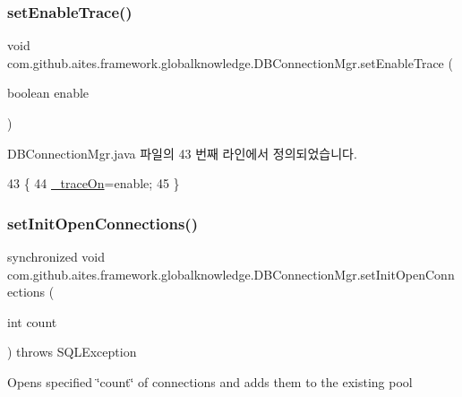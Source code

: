 \subsubsection{\texorpdfstring{set\+Enable\+Trace()}{setEnableTrace()}}
{\footnotesize\ttfamily void com.\+github.\+aites.\+framework.\+globalknowledge.\+D\+B\+Connection\+Mgr.\+set\+Enable\+Trace (\begin{DoxyParamCaption}\item[{boolean}]{enable }\end{DoxyParamCaption})}



D\+B\+Connection\+Mgr.\+java 파일의 43 번째 라인에서 정의되었습니다.


\begin{DoxyCode}
43                                               \{
44         \mbox{\hyperlink{classcom_1_1github_1_1aites_1_1framework_1_1globalknowledge_1_1_d_b_connection_mgr_ad04eb57480228f70094ba6d17c6879eb}{\_traceOn}}=enable;
45     \}
\end{DoxyCode}
\mbox{\label{classcom_1_1github_1_1aites_1_1framework_1_1globalknowledge_1_1_d_b_connection_mgr_a571b6b625377f7ead62765e532b13763}} 
\subsubsection{\texorpdfstring{set\+Init\+Open\+Connections()}{setInitOpenConnections()}}
{\footnotesize\ttfamily synchronized void com.\+github.\+aites.\+framework.\+globalknowledge.\+D\+B\+Connection\+Mgr.\+set\+Init\+Open\+Connections (\begin{DoxyParamCaption}\item[{int}]{count }\end{DoxyParamCaption}) throws S\+Q\+L\+Exception}



Opens specified \char`\"{}count\char`\"{} of connections and adds them to the existing pool 




